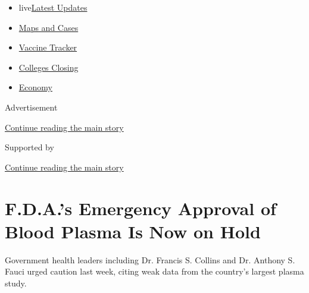 \begin{itemize}
\tightlist
\item
  live\href{https://www.nytimes3xbfgragh.onion/2020/08/20/world/coronavirus-covid.html?name=styln-coronavirus-national\&region=TOP_BANNER\&variant=undefined\&block=storyline_menu_recirc\&action=click\&pgtype=Article\&impression_id=bfa44951-e382-11ea-a48e-b9252519409f}{Latest
  Updates}
\item
  \href{https://www.nytimes3xbfgragh.onion/interactive/2020/us/coronavirus-us-cases.html?name=styln-coronavirus-national\&region=TOP_BANNER\&variant=undefined\&block=storyline_menu_recirc\&action=click\&pgtype=Article\&impression_id=bfa44952-e382-11ea-a48e-b9252519409f}{Maps
  and Cases}
\item
  \href{https://www.nytimes3xbfgragh.onion/interactive/2020/science/coronavirus-vaccine-tracker.html?name=styln-coronavirus-national\&region=TOP_BANNER\&variant=undefined\&block=storyline_menu_recirc\&action=click\&pgtype=Article\&impression_id=bfa44953-e382-11ea-a48e-b9252519409f}{Vaccine
  Tracker}
\item
  \href{https://www.nytimes3xbfgragh.onion/2020/08/19/us/colleges-closing-covid.html?name=styln-coronavirus-national\&region=TOP_BANNER\&variant=undefined\&block=storyline_menu_recirc\&action=click\&pgtype=Article\&impression_id=bfa4be80-e382-11ea-a48e-b9252519409f}{Colleges
  Closing}
\item
  \href{https://www.nytimes3xbfgragh.onion/live/2020/08/20/business/stock-market-today-coronavirus?name=styln-coronavirus-national\&region=TOP_BANNER\&variant=undefined\&block=storyline_menu_recirc\&action=click\&pgtype=Article\&impression_id=bfa4be81-e382-11ea-a48e-b9252519409f}{Economy}
\end{itemize}

Advertisement

\protect\hyperlink{after-top}{Continue reading the main story}

Supported by

\protect\hyperlink{after-sponsor}{Continue reading the main story}

\hypertarget{fdas-emergency-approval-of-blood-plasma-is-now-on-hold}{%
\section{F.D.A.'s Emergency Approval of Blood Plasma Is Now on
Hold}\label{fdas-emergency-approval-of-blood-plasma-is-now-on-hold}}

Government health leaders including Dr. Francis S. Collins and Dr.
Anthony S. Fauci urged caution last week, citing weak data from the
country's largest plasma study.

